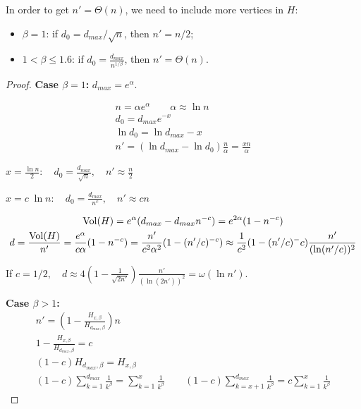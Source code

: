 \begin{lemma}
    \label{lem:powerlaw-coin-toss-size-vol-of-h-large}
    In order to get $n'=\Theta(n)$, we need to include more vertices in $H$:
    \begin{itemize}
        \item $\beta=1$: if $d_0=d_{max}/\sqrt{n}$, then $n'=n/2$;
        \item $1<\beta\leq 1.6$: if $d_0=\frac{d_{max}}{n^{1/\beta}}$, then $n'=\Theta(n)$.
    \end{itemize}
\end{lemma}

\begin{proof}
    \textbf{Case $\beta=1$:}
    $d_{max}=e^\alpha$.
    
    \begin{gather*}
        n=\alpha e^\alpha\qquad\alpha\approx\ln n\\
        d_0=d_{max}e^{-x}\\
        \ln d_0=\ln d_{max}-x\\
        n'=(\ln d_{max}-\ln d_0)\frac{n}{\alpha}=\frac{xn}{\alpha}
    \end{gather*}

    $x=\frac{\ln n}{2}:\quad d_0=\frac{d_{max}}{\sqrt{n}},\quad n'\approx\frac{n}{2}$
    
    $x=c\;\ln n:\quad d_0=\frac{d_{max}}{n^c},\quad n'\approx cn$
    
    \begin{gather*}
        \Vol(H)=e^\alpha(d_{max}-d_{max}n^{-c})=e^{2\alpha}(1-n^{-c})\\
        d=\frac{\Vol(H)}{n'}=\frac{e^\alpha}{c\alpha}(1-n^{-c}) %
        =\frac{n'}{c^2\alpha^2}(1-(n'/c)^{-c})
        \approx\frac{1}{c^2}(1-(n'/c)^-c)\frac{n'}{(\ln (n'/c))^2}
    \end{gather*}
    
    If $c=1/2,\quad d\approx4\left(1-\frac{1}{\sqrt{2n'}}\right)\frac{n'}{(\ln (2n'))^2}=\omega(\ln n')$.
    
    \textbf{Case $\beta>1$:}
    \begin{gather*}
        n'=\left(1-\frac{H_{x,\beta}}{H_{d_{max},\beta}}\right)n\\
        1-\frac{H_{x,\beta}}{H_{d_{max},\beta}}=c\\
        (1-c)H_{d_{max},\beta}=H_{x,\beta}\\
        (1-c)\sum_{k=1}^{d_{max}}\frac{1}{k^\beta}=\sum_{k=1}^{x}\frac{1}{k^\beta}
        \qquad(1-c)\sum_{k=x+1}^{d_{max}}\frac{1}{k^\beta}=c\sum_{k=1}^{x}\frac{1}{k^\beta}
    \end{gather*}
    

\end{proof}
